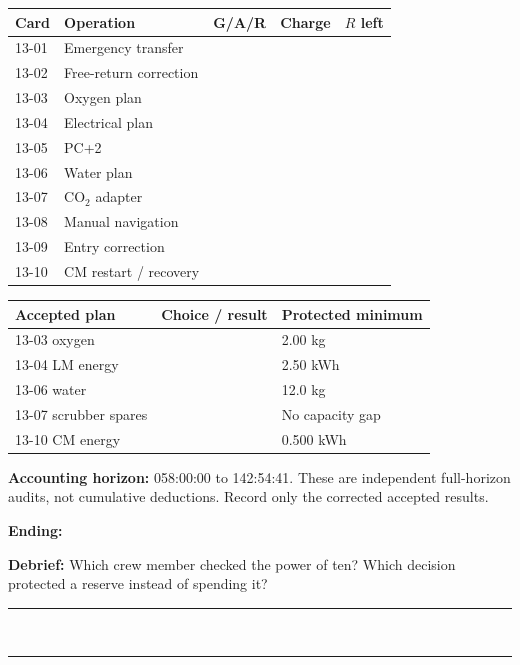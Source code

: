 \documentclass[11pt]{article}
\begin{document}
\renewcommand{\arraystretch}{1.45}
\begin{tabularx}{\linewidth}{@{}lXccc@{}}
\toprule
Card & Operation & G/A/R & Charge & \(R\) left\\
\midrule
13-01 & Emergency transfer & & &\\
13-02 & Free-return correction & & &\\
13-03 & Oxygen plan & & &\\
13-04 & Electrical plan & & &\\
13-05 & PC+2 & & &\\
13-06 & Water plan & & &\\
13-07 & CO\(_2\) adapter & & &\\
13-08 & Manual navigation & & &\\
13-09 & Entry correction & & &\\
13-10 & CM restart / recovery & & &\\
\bottomrule
\end{tabularx}
\renewcommand{\arraystretch}{1}

\begin{tabularx}{\linewidth}{@{}lXX@{}}
\toprule
Accepted plan & Choice / result & Protected minimum\\
\midrule
13-03 oxygen & \hrulefill & 2.00 kg\\
13-04 LM energy & \hrulefill & 2.50 kWh\\
13-06 water & \hrulefill & 12.0 kg\\
13-07 scrubber spares & \hrulefill & No capacity gap\\
13-10 CM energy & \hrulefill & 0.500 kWh\\
\bottomrule
\end{tabularx}

\textbf{Accounting horizon:} 058:00:00 to 142:54:41.
These are independent full-horizon audits, not cumulative deductions.
Record only the corrected accepted results.

\textbf{Ending:}\ \hrulefill

\vfill
\textbf{Debrief:} Which crew member checked the power of ten? Which
decision protected a reserve instead of spending it?
\\[25pt]\rule{\linewidth}{0.3pt}\\[25pt]\rule{\linewidth}{0.3pt}

\clearpage

\end{document}

